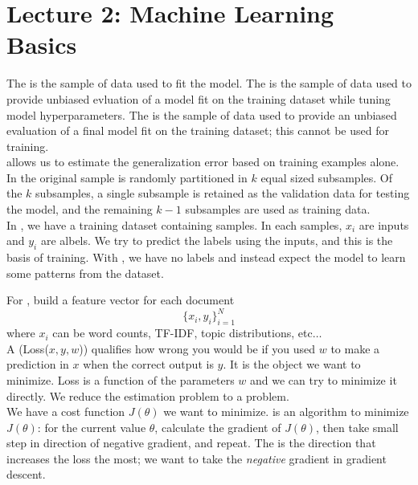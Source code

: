 \documentclass{article}
\begin{document}
\section{Lecture 2: Machine Learning Basics}

The  is the sample of data used to fit the model. The  is the sample of data used to provide unbiased evluation of a model fit on the training dataset while tuning model hyperparameters. The  is the sample of data used to provide an unbiased evaluation of a final model fit on  the training dataset; this cannot be used for training. \\ 

 allows us to estimate the generalization error based on training examples alone. In  the original sample is randomly partitioned in $k$ equal sized subsamples. Of the $k$ subsamples, a single subsample is retained as the validation data for testing the model, and the remaining $k-1$ subsamples are used as training data. \\ 

In , we have a training dataset containing samples. In each samples, $x_i$ are inputs and $y_i$ are albels. We try to predict the labels using the inputs, and this is the basis of training. With , we have no labels and instead expect the model to learn some patterns from the dataset. 

For , build a feature vector for each document $$\{x_i , y_i \}^{N}_{i=1}$$ where $x_i$ can be word counts, TF-IDF, topic distributions, etc$\dots$ \\ 

A  (Loss($x,y,w$)) qualifies how wrong you would be if you used $w$ to make a prediction in $x$ when the correct output is $y$. It is the object we want to minimize. Loss is a function of the parameters $w$ and we can try to minimize it directly. We reduce the estimation problem to a  problem. \\ 

We have a cost function $J(\theta)$ we want to minimize.  is an algorithm to minimize $J(\theta)$: for the current value $\theta$, calculate the gradient of $J(\theta)$, then take small step in direction of negative gradient, and repeat. The  is the direction that increases the loss the most; we want to take the \emph{negative} gradient in gradient descent. \\ 
\end{document}

